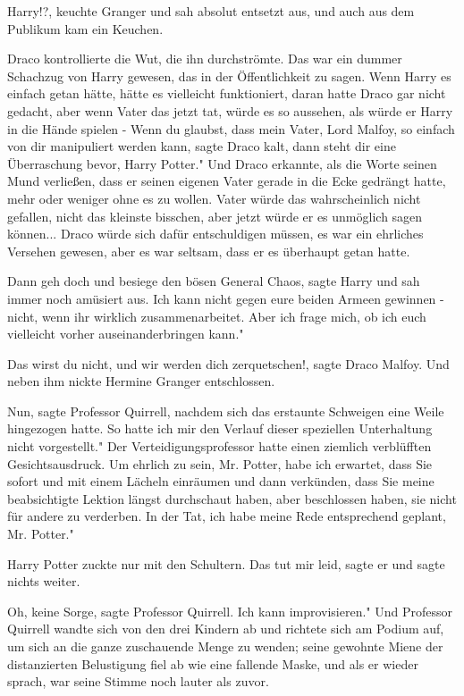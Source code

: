 \glqq{}Harry!?\grqq{}, keuchte Granger und sah absolut entsetzt aus, und auch aus
dem Publikum kam ein Keuchen.

Draco kontrollierte die Wut, die ihn durchströmte. Das war ein dummer Schachzug
von Harry gewesen, das in der Öffentlichkeit zu sagen. Wenn Harry es einfach
getan hätte, hätte es vielleicht funktioniert, daran hatte Draco gar nicht
gedacht, aber wenn Vater das jetzt tat, würde es so aussehen, als würde er Harry
in die Hände spielen - \glqq{}Wenn du glaubst, dass mein Vater, Lord Malfoy, so
einfach von dir manipuliert werden kann\grqq{}, sagte Draco kalt, \glqq{}dann
steht dir eine Überraschung bevor, Harry Potter." Und Draco erkannte, als die
Worte seinen Mund verließen, dass er seinen eigenen Vater gerade in die Ecke
gedrängt hatte, mehr oder weniger ohne es zu wollen. Vater würde das
wahrscheinlich nicht gefallen, nicht das kleinste bisschen, aber jetzt würde er
es unmöglich sagen können... Draco würde sich dafür entschuldigen müssen, es war
ein ehrliches Versehen gewesen, aber es war seltsam, dass er es überhaupt getan
hatte.

\glqq{}Dann geh doch und besiege den bösen General Chaos\grqq{}, sagte Harry und
sah immer noch amüsiert aus. \glqq{}Ich kann nicht gegen eure beiden Armeen
gewinnen - nicht, wenn ihr wirklich zusammenarbeitet. Aber ich frage mich, ob
ich euch vielleicht vorher auseinanderbringen kann."

\glqq{}Das wirst du nicht, und wir werden dich zerquetschen!\grqq{}, sagte Draco
Malfoy. Und neben ihm nickte Hermine Granger entschlossen.

\glqq{}Nun\grqq{}, sagte Professor Quirrell, nachdem sich das erstaunte Schweigen
eine Weile hingezogen hatte. \glqq{}So hatte ich mir den Verlauf dieser
speziellen Unterhaltung nicht vorgestellt." Der Verteidigungsprofessor hatte
einen ziemlich verblüfften Gesichtsausdruck. \glqq{}Um ehrlich zu sein, Mr.
Potter, habe ich erwartet, dass Sie sofort und mit einem Lächeln einräumen und
dann verkünden, dass Sie meine beabsichtigte Lektion längst durchschaut haben,
aber beschlossen haben, sie nicht für andere zu verderben. In der Tat, ich habe
meine Rede entsprechend geplant, Mr. Potter."

Harry Potter zuckte nur mit den Schultern. \glqq{}Das tut mir leid\grqq{}, sagte
er und sagte nichts weiter.

\glqq{}Oh, keine Sorge\grqq{}, sagte Professor Quirrell. \glqq{}Ich kann
improvisieren." Und Professor Quirrell wandte sich von den drei Kindern ab und
richtete sich am Podium auf, um sich an die ganze zuschauende Menge zu wenden;
seine gewohnte Miene der distanzierten Belustigung fiel ab wie eine fallende
Maske, und als er wieder sprach, war seine Stimme noch lauter als zuvor.

